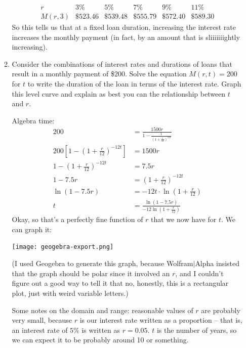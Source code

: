 \documentclass[10pt]{article}
\newenvironment{red}{\color{red}}{\ignorespacesafterend}
\begin{document}
\begin{enumerate}[leftmargin=0pt]
\begin{enumerate}
        \begin{red}
        \[
        \begin{array}{c|c|c|c|c|c}
            r       & 3\%      & 5\%      & 7\%      & 9\%      & 11\%     \\ \hline
            M(r, 3) & \$523.46 & \$539.48 & \$555.79 & \$572.40 & \$589.30
        \end{array}
        \]
        So this tells us that at a fixed loan duration, increasing the interest rate increases the monthly payment (in fact, by an amount that is sliiiiiiightly increasing).
        \end{red}
        \item Consider the combinations of interest rates and durations of loans that result in a monthly payment of \$200. Solve the equation $M(r, t) = 200$ for $t$ to write the duration of the loan in terms of the interest rate. Graph this level curve and explain as best you can the relationship between $t$ and $r$.
        
        \begin{red}
        Algebra time:
        \begin{align*}
            200 &= \frac{1500r}{1-\frac{1}{\left(1+\frac{r}{12}\right)^{12t}}}\\
            200\left[1-\left(1+\frac{r}{12}\right)^{-12t}\right] &= 1500r \\
            1-\left(1+\frac{r}{12}\right)^{-12t} &= 7.5 r \\
            1-7.5r &= \left(1+\frac{r}{12}\right)^{-12t}\\
            \ln(1-7.5r) &= -12t \cdot \ln\left(1+\frac{r}{12}\right) \\
            t &= \frac{\ln(1-7.5r)}{-12\ln\left(1+\frac{r}{12}\right)}
        \end{align*}
        Okay, so that's a perfectly fine function of $r$ that we now have for $t$. We can graph it:\\
        \begin{center}
            \texttt{[image: geogebra-export.png]}\\
        \end{center}
        (I used Geogebra to generate this graph, because Wolfram$|$Alpha insisted that the graph should be polar since it involved an $r$, and I couldn't figure out a good way to tell it that no, honestly, this is a rectangular plot, just with weird variable letters.)
        
        Some notes on the domain and range: reasonable values of $r$ are probably very small, because $r$ is our interest rate written as a proportion -- that is, an interest rate of $5\%$ is written as $r = 0.05$. $t$ is the number of years, so we can expect it to be probably around 10 or something.
        

\end{red}
\end{enumerate}
\end{enumerate}
\end{document}
